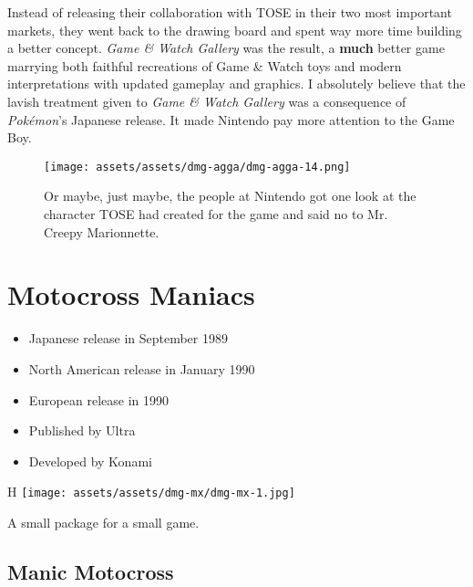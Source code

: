 \documentclass{book}
\begin{document}
Instead of releasing their collaboration with TOSE in their two most important markets, they went back to the drawing board and spent way more time building a better concept. \emph{Game \& Watch Gallery} was the result, a \textbf{much} better game marrying both faithful recreations of Game \& Watch toys and modern interpretations with updated gameplay and graphics. I absolutely believe that the lavish treatment given to \emph{Game \& Watch Gallery} was a consequence of \emph{Pokémon}’s Japanese release. It made Nintendo pay more attention to the Game Boy.

\begin{figure}[hbt]
\vskip 10pt
\centering \texttt{[image: assets/assets/dmg-agga/dmg-agga-14.png]}\par\pagetwodescription Or maybe, just maybe, the people at Nintendo got one look at the character TOSE had created for the game and said no to Mr. Creepy Marionnette.
\vskip 6pt
\end{figure}


\begingroup \chapter*{Motocross Maniacs} \endgroup

\begin{itemize} \setlength\itemsep{-0.4em}
\item Japanese release in September 1989
\item North American release in January 1990
\item European release in 1990
\item Published by Ultra
\item Developed by Konami
\end{itemize}\noindent

\begin{wrapfigure}{H}{\linewidth}
\vskip 4pt
\centering \texttt{[image: assets/assets/dmg-mx/dmg-mx-1.jpg]}\par\pagetwodescription A small package for a small game.\end{wrapfigure}
\clearpage

\FloatBarrier\needspace{10mm}\section*{Manic Motocross}\nopagebreak[4]
\end{document}
